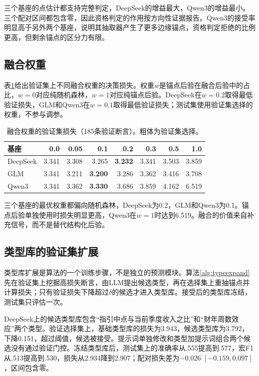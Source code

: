 三个基座的点估计都支持完整判定，DeepSeek的增益最大，Qwen3的增益最小。三个配对区间都包含零，因此资格判定的作用按方向性证据报告。Qwen3的接受率明显高于另外两个基座，说明其抽取器产生了更多边缘锚点，资格判定拒绝的比例更高，但剩余锚点的区分力有限。

\subsection{融合权重}

表\ref{tab:weight}给出验证集上不同融合权重的决策损失。权重$w$是锚点后验在融合后验中的占比，$w=0$对应纯随机森林，$w=1$对应纯锚点后验。DeepSeek在$w=0.2$取得最低验证损失，GLM和Qwen3在$w=0.1$取得最低验证损失；测试集使用验证集选择的权重，不参与调参。

\begin{table}[htbp]
\centering
{}
\setlength{\tabcolsep}{4pt}
\caption{融合权重的验证集损失（185条验证断言）。粗体为验证集选择。}
\label{tab:weight}
\begin{tabular}{lrrrrrrr}
\toprule
基座 & 0.0 & 0.05 & 0.1 & 0.2 & 0.3 & 0.5 & 1.0 \\
\midrule
DeepSeek & 3.341 & 3.308 & 3.265 & \textbf{3.232} & 3.341 & 3.503 & 3.859 \\
GLM & 3.341 & 3.211 & \textbf{3.200} & 3.286 & 3.362 & 3.416 & 3.708 \\
Qwen3 & 3.341 & 3.362 & \textbf{3.330} & 3.686 & 3.859 & 4.162 & 6.519 \\
\bottomrule
\end{tabular}
\end{table}

三个基座的最优权重都偏向随机森林，DeepSeek为0.2，GLM和Qwen3为0.1。锚点后验单独使用时损失明显更高，Qwen3在$w=1$时达到6.519。融合的价值来自补充信号，而不是替代结构化后验。

\subsection{类型库的验证集扩展}

类型库扩展是算法的一个训练步骤，不是独立的预测模块。算法\ref{alg:typeexpand}先在验证集上挖掘高损失断言，由LLM提出候选类型，再在选择集上重抽锚点并计算损失；只有验证损失下降超过$\delta$的候选才进入类型库。接受后的类型库冻结，测试集只评估一次。


DeepSeek上的候选类型库包含“指引中点与当前季度收入之比”和“财年周数效应”两个类型。验证选择集上，基础类型库的损失为3.943，候选类型库为3.792，下降0.151，超过阈值，候选被接受。提示词单独修改和类型加提示词组合两个候选没有通过验证门控。冻结类型库后，测试集上的准确率从.555提高到.577，宏F1从.513提高到.530，损失从2.934降到2.907；配对损失差为$-0.026$ $[-0.159,0.097]$，区间包含零。


